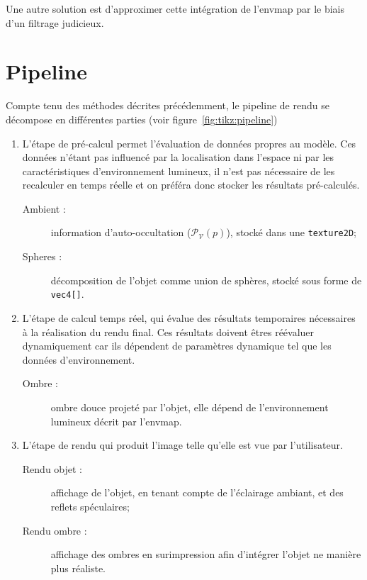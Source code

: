 \documentclass[10pt,a4paper,twoside, twocolumn]{report}
\newcommand*{\rootPath}{../}
\begin{document}
Une autre solution est d'approximer cette intégration de l'envmap par le biais d'un filtrage judicieux. 


\section{Pipeline}

\begin{figure*}
	\centering
	
	\caption{Pipeline développé}
	\label{fig:tikz:pipeline}
\end{figure*}

Compte tenu des méthodes décrites précédemment, le pipeline de rendu se décompose en différentes parties (voir figure~\ref{fig:tikz:pipeline})
\begin{enumerate}
	\item L'étape de pré-calcul permet l'évaluation de données propres au modèle. Ces données n'étant pas influencé par la localisation dans l'espace ni par les caractéristiques d'environnement lumineux, il n'est pas nécessaire de les recalculer en temps réelle et on préféra donc stocker les résultats pré-calculés.
		\begin{description}
			\item[Ambient :] information d'auto-occultation ($\mathcal P_{\mathcal V}(p)$), stocké dans une \texttt{texture2D};
			\item[Spheres :] décomposition de l'objet comme union de sphères, stocké sous forme de \texttt{vec4[]}.
		\end{description}

	\item L'étape de calcul temps réel, qui évalue des résultats temporaires nécessaires à la réalisation du rendu final. Ces résultats doivent êtres réévaluer dynamiquement car ils dépendent de paramètres dynamique tel que les données d'environnement.
		\begin{description}
			\item[Ombre :] ombre douce projeté par l'objet, elle dépend de l'environnement lumineux décrit par l'envmap.
		\end{description}
	
	\item L'étape de rendu qui produit l'image telle qu'elle est vue par l'utilisateur.
		\begin{description}
			\item[Rendu objet :] affichage de l'objet, en tenant compte de l'éclairage ambiant, et des reflets spéculaires;
			\item[Rendu ombre :] affichage des ombres en surimpression afin d'intégrer l'objet ne manière plus réaliste.
		\end{description}
\end{enumerate}
\end{document}
